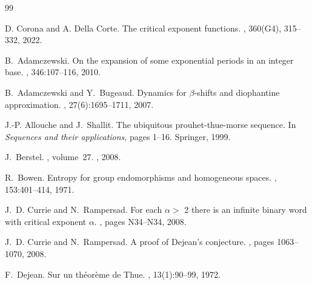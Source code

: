 \documentclass[12pt]{article}
\theoremstyle{plain}\newtheorem{teo}{Theorem}
\theoremstyle{plain}\newtheorem{proposition}[teo]{Proposition}
\theoremstyle{plain}\newtheorem{lemma}[teo]{Lemma}
\theoremstyle{plain}\newtheorem{corollary}[teo]{Corollary}
\theoremstyle{plain}\newtheorem{conjecture}[teo]{Conjecture}
\theoremstyle{definition}\newtheorem{definition}[teo]{Definition}
\theoremstyle{remark}\newtheorem{remark}[teo]{Remark}
\theoremstyle{definition}\newtheorem{example}[teo]{Example}
\numberwithin{teo}{section}
\numberwithin{equation}{section}
\begin{document}
\begin{thebibliography}{99}

	D. Corona and A. Della Corte.
	\newblock The critical exponent functions.
	,
	360(G4), 315--332, 2022.

	B.~Adamczewski.
	\newblock On the expansion of some exponential periods in an integer base.
	, 346:107--116, 2010.

	B.~Adamczewski and Y.~Bugeaud.
	\newblock Dynamics for $\beta$-shifts and diophantine approximation.
	, 27(6):1695–1711, 2007.

	J.-P. Allouche and J.~Shallit.
	\newblock The ubiquitous prouhet-thue-morse sequence.
	\newblock In {\em Sequences and their applications}, pages 1--16. Springer,
	1999.


	J.~Berstel.
	, volume~27.
	, 2008.

	R.~Bowen.
	\newblock Entropy for group endomorphisms and homogeneous spaces.
	,
	153:401--414, 1971.

	J.~D. Currie and N.~Rampersad.
	\newblock For each {{$\alpha>$ 2}} there is an infinite binary word with
	critical exponent {{$\alpha$}}.
	, pages N34--N34, 2008.
	
	J.~D. Currie and N.~Rampersad.
	\newblock A proof of Dejean's conjecture.
	, pages 1063--1070, 2008.

	F.~Dejean.
	\newblock Sur un th\'eor\`eme de {{Thue}}.
	, 13(1):90--99, 1972.


\end{thebibliography}
\end{document}
